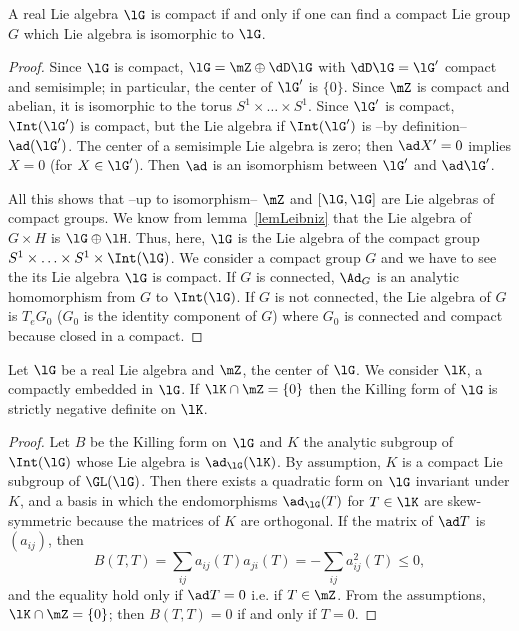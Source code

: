 \begin{proposition}
	A real Lie algebra $\lG$ is compact if and only if one can find a compact Lie group $G$ which Lie algebra is isomorphic to $\lG$.
	\label{prop:alg_grp_compact}
\end{proposition}

\begin{proof}
	 Since $\lG$ is compact, $\lG=\mZ\oplus\dD\lG$ with $\dD\lG=\lG'$ compact and semisimple; in particular, the center of $\lG'$ is $\{0\}$. Since $\mZ$ is compact and abelian, it is isomorphic to the torus $S^1\times\ldots\times S^1$. Since $\lG'$ is compact, $\Int(\lG')$ is compact, but the Lie algebra if $\Int(\lG')$ is --by definition--  $\ad(\lG')$. The center of a semisimple Lie algebra is zero; then $\ad X'=0$ implies $X=0$ (for $X\in\lG'$). Then $\ad$ is an isomorphism between $\lG'$ and $\ad\lG'$.

	All this shows that --up to isomorphism-- $\mZ$ and $[\lG,\lG]$ are Lie algebras of compact groups. We know from lemma~\ref{lemLeibniz} that the Lie algebra of $G\times H$ is $\lG\oplus\lH$. Thus, here, $\lG$ is the Lie algebra of the compact group $S^1\times\ldots\times S^1\times\Int(\lG)$.
	We consider a compact group $G$ and we have to see the its Lie algebra $\lG$ is compact. If $G$ is connected, $\Ad_G$ is an analytic homomorphism from $G$ to $\Int(\lG)$. If $G$ is not connected, the Lie algebra of $G$ is $T_eG_0$ ($G_0$ is the identity component of $G$) where $G_0$ is connected and compact because closed in a compact.
\end{proof}

\begin{proposition}
	Let $\lG$ be a real Lie algebra and $\mZ$, the center of $\lG$. We consider $\lK$, a compactly embedded in $\lG$. If $\lK\cap\mZ=\{0\}$ then the Killing form of $\lG$ is strictly negative definite on $\lK$.
	\label{prop:K_Z_Killing}
\end{proposition}

\begin{proof}
	Let $B$ be the Killing form on $\lG$ and $K$ the analytic subgroup of $\Int(\lG)$ whose Lie algebra is $\ad_{\lG}(\lK)$. By assumption, $K$ is a compact Lie subgroup of $\GL(\lG)$. Then there exists a quadratic form on $\lG$ invariant under $K$, and a basis in which the endomorphisms $\ad_{\lG}(T)$ for $T\in\lK$ are skew-symmetric because the matrices of $K$ are orthogonal. If the matrix of $\ad T$ is $(a_{ij})$, then
	\begin{equation}
		B(T,T)=\sum_{ij}a_{ij}(T)a_{ji}(T)
		=-\sum_{ij}a_{ij}^2(T)\leq 0,
	\end{equation}
	and the equality hold only if $\ad T=0$ i.e. if $T\in\mZ$. From the assumptions, $\lK\cap\mZ=\{0\}$; then $B(T,T)=0$ if and only if $T=0$.
\end{proof}
